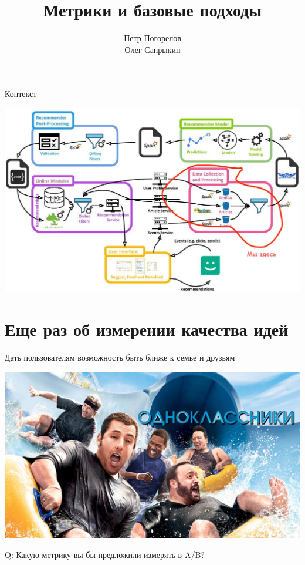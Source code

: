 \documentclass[11pt,aspectratio=169,handout]{beamer}
\author{Петр Погорелов\\Олег Сапрыкин}
\title{Метрики и базовые подходы}
\begin{document}
{

\begin{frame}
\titlepage
\end{frame}

}

\begin{frame}{Контекст}

\begin{center}
\includegraphics[scale=0.23]{images/mendeley.jpeg}
\end{center}

\end{frame}

\section{Еще раз об измерении качества идей}

\begin{frame}{}

\begin{tcolorbox}[colback=gray!5,colframe=gray!80,title=Миссия компании]
Дать пользователям возможность быть ближе к семье и друзьям
\end{tcolorbox}

\vfill

\begin{center}
\includegraphics[scale=0.1]{images/odnoklassniki.jpeg}
\end{center}

\vfill

Q: Какую метрику вы бы предложили измерять в A/B?

\end{frame}
\end{document}
